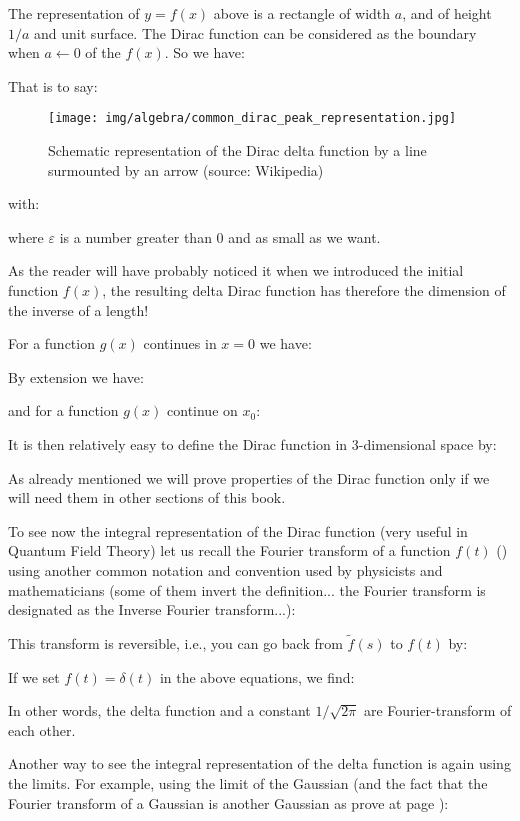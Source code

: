 	The representation of $y=f(x)$ above is a rectangle of width $a$, and of height $1/ a$ and unit surface. The Dirac function can be considered as the boundary when $a\leftarrow 0$ of the  $f (x)$. So we have:		
	
	That is to say:
	\begin{figure}[H]
		\centering
		\texttt{[image: img/algebra/common\_dirac\_peak\_representation.jpg]}
		\caption[Schematic representation of the Dirac delta function by a line surmounted by an arrow]{Schematic representation of the Dirac delta function by a line surmounted by an arrow (source: Wikipedia)}
	\end{figure}
	with:
	
	where $\varepsilon$ is a number greater than $0$ and as small as we want.
	\begin{tcolorbox}[title=Remark,colframe=black,arc=10pt]
		As the reader will have probably noticed it when we introduced the initial function $f (x)$, the resulting delta Dirac function has therefore the dimension of the inverse of a length!
	\end{tcolorbox}
	For a function $g (x)$ continues in $x = 0$ we have:
	
	By extension we have:
	
	and for a function $g (x)$ continue on $x_0$:
	
	It is then relatively easy to define the Dirac function in 3-dimensional space by:
	
	As already mentioned we will prove properties of the Dirac function only if we will need them in other sections of this book.
	
	To see now the integral representation of the Dirac function (very useful in Quantum Field Theory) let us recall the Fourier transform of a function $f(t)$ () using another common notation and convention used by physicists and mathematicians (some of them invert the definition... the Fourier transform is designated as the Inverse Fourier transform...):
	
	This transform is reversible, i.e., you can go back from $\tilde{f}(s)$ to $f(t)$ by:
	
	If we set $f(t)=\delta(t)$ in the above equations, we find:
	
	In other words, the delta function and a constant $1 / \sqrt{2 \pi}$ are Fourier-transform of each other.
	
	Another way to see the integral representation of the delta function is again using the limits. For example, using the limit of the Gaussian (and the fact that the Fourier transform of a Gaussian is another Gaussian as prove at page \pageref{fourier transform gaussian function}):
	
